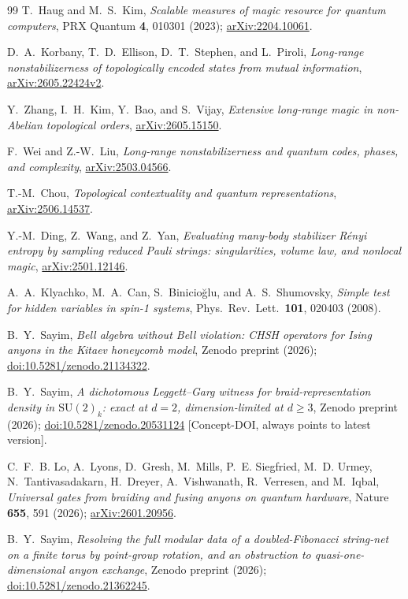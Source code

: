 \documentclass[aps,pra,twocolumn,superscriptaddress,longbibliography,floatfix,nofootinbib]{revtex4-2}
\begin{document}
\begin{thebibliography}{99}
T.~Haug and M.~S.~Kim,
\emph{Scalable measures of magic resource for quantum computers},
PRX Quantum \textbf{4}, 010301 (2023);
\href{https://arxiv.org/abs/2204.10061}{arXiv:2204.10061}.

D.~A.~Korbany, T.~D.~Ellison, D.~T.~Stephen, and L.~Piroli,
\emph{Long-range nonstabilizerness of topologically encoded states
from mutual information},
\href{https://arxiv.org/abs/2605.22424v2}{arXiv:2605.22424v2}.

Y.~Zhang, I.~H.~Kim, Y.~Bao, and S.~Vijay,
\emph{Extensive long-range magic in non-Abelian topological orders},
\href{https://arxiv.org/abs/2605.15150}{arXiv:2605.15150}.

F.~Wei and Z.-W.~Liu,
\emph{Long-range nonstabilizerness and quantum codes, phases, and
complexity},
\href{https://arxiv.org/abs/2503.04566}{arXiv:2503.04566}.

T.-M.~Chou,
\emph{Topological contextuality and quantum representations},
\href{https://arxiv.org/abs/2506.14537}{arXiv:2506.14537}.

Y.-M.~Ding, Z.~Wang, and Z.~Yan,
\emph{Evaluating many-body stabilizer Rényi entropy by sampling
reduced Pauli strings: singularities, volume law, and nonlocal magic},
\href{https://arxiv.org/abs/2501.12146}{arXiv:2501.12146}.

A.~A.~Klyachko, M.~A.~Can, S.~Binicio\u{g}lu, and A.~S.~Shumovsky,
\emph{Simple test for hidden variables in spin-1 systems},
Phys.\ Rev.\ Lett.\ \textbf{101}, 020403 (2008).

B.~Y.~Sayim,
\emph{Bell algebra without Bell violation: CHSH operators for Ising
anyons in the Kitaev honeycomb model},
Zenodo preprint (2026);
\href{https://doi.org/10.5281/zenodo.21134322}{doi:10.5281/zenodo.21134322}.

B.~Y.~Sayim,
\emph{A dichotomous Leggett--Garg witness for braid-representation
density in $\mathrm{SU}(2)_k$: exact at $d=2$, dimension-limited at
$d\ge3$},
Zenodo preprint (2026);
\href{https://doi.org/10.5281/zenodo.20531124}{doi:10.5281/zenodo.20531124}
[Concept-DOI, always points to latest version].

C.~F.~B. Lo, A.~Lyons, D.~Gresh, M.~Mills, P.~E. Siegfried, M.~D. Urmey,
N.~Tantivasadakarn, H.~Dreyer, A.~Vishwanath, R.~Verresen, and M.~Iqbal,
\emph{Universal gates from braiding and fusing anyons on quantum
hardware},
Nature \textbf{655}, 591 (2026);
\href{https://arxiv.org/abs/2601.20956}{arXiv:2601.20956}.

B.~Y.~Sayim,
\emph{Resolving the full modular data of a doubled-Fibonacci string-net on a finite torus by
point-group rotation, and an obstruction to quasi-one-dimensional anyon exchange},
Zenodo preprint (2026);
\href{https://doi.org/10.5281/zenodo.21362245}{doi:10.5281/zenodo.21362245}.

\end{thebibliography}
\end{document}
